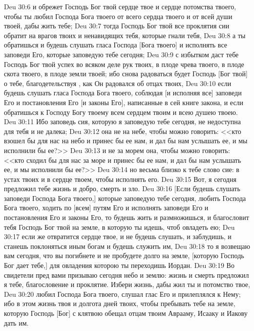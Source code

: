 \vs Deu 30:6 и обрежет Господь Бог твой сердце твое и сердце потомства твоего, чтобы ты любил Господа Бога твоего от всего сердца твоего и от всей души твоей, дабы жить тебе;
\vs Deu 30:7 тогда Господь Бог твой все проклятия сии обратит на врагов твоих и ненавидящих тебя, которые гнали тебя,
\vs Deu 30:8 а ты обратишься и будешь слушать гласа Господа [Бога твоего] и исполнять все заповеди Его, которые заповедую тебе сегодня;
\vs Deu 30:9 с избытком даст тебе Господь Бог твой успех во всяком деле рук твоих, в плоде чрева твоего, в плоде скота твоего, в плоде земли твоей; ибо снова радоваться будет Господь [Бог твой] о тебе, благодетельствуя , как Он радовался об отцах твоих,
\vs Deu 30:10 если будешь слушать гласа Господа Бога твоего, соблюдая [и исполняя все] заповеди Его и постановления Его [и законы Его], написанные в сей книге закона, и если обратишься к Господу Богу твоему всем сердцем твоим и всею душею твоею.
\vs Deu 30:11 Ибо заповедь сия, которую я заповедую тебе сегодня, не недоступна для тебя и не далека;
\vs Deu 30:12 она не на небе, чтобы можно  говорить: <<кто взошел бы для нас на небо и принес бы ее нам, и дал бы нам услышать ее, и мы исполнили бы ее?>>
\vs Deu 30:13 и не за морем она, чтобы можно  говорить: <<кто сходил бы для нас за море и принес бы ее нам, и дал бы нам услышать ее, и мы исполнили бы ее?>>
\vs Deu 30:14 но весьма близко к тебе слово сие:  в устах твоих и в сердце твоем, чтобы исполнять его.
\vs Deu 30:15 Вот, я сегодня предложил тебе жизнь и добро, смерть и зло.
\vs Deu 30:16 [Если будешь слушать заповеди Господа Бога твоего,] которые заповедую тебе сегодня, любить Господа Бога твоего, ходить по [всем] путям Его и исполнять заповеди Его и постановления Его и законы Его, то будешь жить и размножишься, и благословит тебя Господь Бог твой на земле, в которую ты идешь, чтоб овладеть ею;
\vs Deu 30:17 если же отвратится сердце твое, и не будешь слушать, и заблудишь, и станешь поклоняться иным богам и будешь служить им,
\vs Deu 30:18 то я возвещаю вам сегодня, что вы погибнете и не пробудете долго на земле, [которую Господь Бог дает тебе,] для овладения которою ты переходишь Иордан.
\vs Deu 30:19 Во свидетели пред вами призываю сегодня небо и землю: жизнь и смерть предложил я тебе, благословение и проклятие. Избери жизнь, дабы жил ты и потомство твое,
\vs Deu 30:20 любил Господа Бога твоего, слушал глас Его и прилеплялся к Нему; ибо в этом жизнь твоя и долгота дней твоих, чтобы пребывать тебе на земле, которую Господь [Бог] с клятвою обещал отцам твоим Аврааму, Исааку и Иакову дать им.

